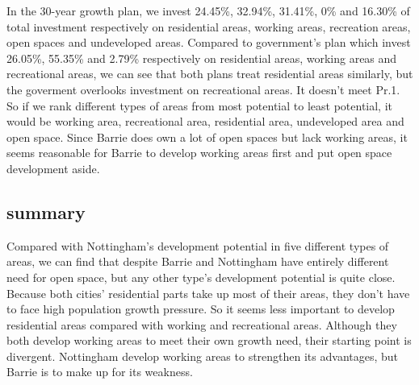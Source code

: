 In the 30-year growth plan, we invest 24.45\%, 32.94\%, 31.41\%, 0\% and 16.30\% of total investment respectively on residential areas, working areas, recreation areas, open spaces and undeveloped areas. Compared to government's plan which invest 26.05\%, 55.35\% and 2.79\% respectively on residential areas, working areas and recreational areas, we can see that both plans treat residential areas similarly, but the goverment overlooks investment on recreational areas. It doesn't meet Pr.1. So if we rank different types of areas from most potential to least potential, it would be working area, recreational area, residential area, undeveloped area and open space. Since Barrie does own a lot of open spaces but lack working areas, it seems reasonable for Barrie to develop working areas first and put open space development aside.
\subsection{summary}
Compared with Nottingham's development potential in five different types of areas, we can find that despite Barrie and Nottingham have entirely different need for open space, but any other type's development potential is quite close. Because both cities' residential parts take up most of their areas, they don't have to face high population growth pressure. So it seems less important to develop residential areas compared with working and recreational areas. Although they both develop working areas to meet their own growth need, their starting point is divergent. Nottingham develop working areas to strengthen its advantages, but Barrie is to make up for its weakness.

\printbibliography

